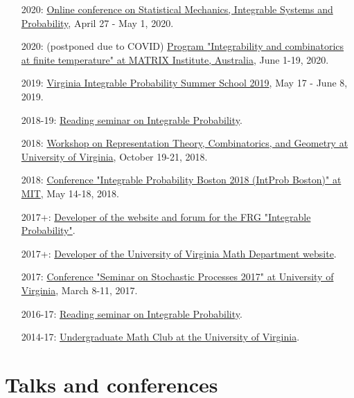 \documentclass[letterpaper,11pt]{article}
\begin{document}
\begin{itemize}
\item [2020:]
\href{http://mtikhonov.com/smisp/}{Online conference on Statistical Mechanics, Integrable Systems and Probability},
April 27 - May 1, 2020.

\item [2020:]
(postponed due to COVID)
\href{https://www.matrix-inst.org.au/events/integrability-and-combinatorics-at-finite-temperature/}{Program "Integrability and combinatorics at finite temperature" at MATRIX Institute, Australia},
June 1-19, 2020.

\item [2019:]
\href{http://vipss.int-prob.org/}{Virginia Integrable Probability Summer School 2019},
May 17 - June 8, 2019.

\item[2018-19:]
\href{https://lpetrov.cc/reading-2019/}{Reading seminar on Integrable Probability}.

\item [2018:]
\href{http://math.virginia.edu/ims/workshop-fall-2018/}{Workshop on Representation Theory, Combinatorics, and Geometry at University of Virginia},
October 19-21, 2018.

\item [2018:]
\href{http://frg.int-prob.org/conference2018/}{Conference "Integrable Probability Boston 2018 (IntProb Boston)" at MIT},
May 14-18, 2018.

\item [2017+:]
\href{http://frg.int-prob.org/}{Developer of the website and forum for the FRG "Integrable Probability"}.

\item [2017+:]
\href{http://math.virginia.edu/}{Developer of the University of Virginia Math Department website}.

\item [2017:]
\href{http://faculty.virginia.edu/ssp17/}{Conference "Seminar on Stochastic Processes 2017" at University of Virginia},
March 8-11, 2017.

\item [2016-17:]
\href{https://lpetrov.cc/2016/12/reading-seminar/}{Reading seminar on Integrable Probability}.

\item [2014-17:]
\href{http://math.virginia.edu/seminars/mathclub/}{Undergraduate Math Club at the University of Virginia}.
\end{itemize}

\section*{Talks and conferences}
\end{document}
